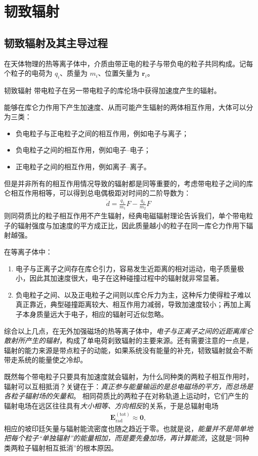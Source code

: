 \section{韧致辐射}
\subsection{韧致辐射及其主导过程}
在天体物理的热等离子体中，介质由带正电的粒子与带负电的粒子共同构成。记每个粒子的电荷为 $q_i$、质量为 $m_i$、位置矢量为 $\boldsymbol r_i$。
\begin{definition}{韧致辐射}
    带电粒子在另一带电粒子的库伦场中获得加速度产生的辐射。
\end{definition}
能够在库仑力作用下产生加速度、从而可能产生辐射的两体相互作用，大体可以分为三类：
\begin{itemize}
  \item 负电粒子与正电粒子之间的相互作用，例如电子与离子；
  \item 负电粒子之间的相互作用，例如电子--电子；
  \item 正电粒子之间的相互作用，例如离子--离子。
\end{itemize}
但是并非所有的相互作用情况导致的辐射都是同等重要的，考虑带电粒子之间的库仑相互作用相等，可以得到总电偶极距对时间的二阶导数为：
\begin{align}
    \ddot{d} = \frac{q_1}{m_1}F - \frac{q_2}{m_2}F
\end{align}
则同荷质比的粒子相互作用不产生辐射，经典电磁辐射理论告诉我们，单个带电粒子的辐射强度与加速度的平方成正比，因此质量越小的粒子在同一库仑力作用下辐射越强。

在等离子体中：
\begin{enumerate}
  \item 电子与正离子之间存在库仑引力，容易发生近距离的相对运动，电子质量极小，因此其加速度很大，电子在这种碰撞过程中的辐射就非常显著。
  \item 负电粒子之间、以及正电粒子之间则以库仑斥力为主，这种斥力使得粒子难以真正靠近，典型碰撞距离较大、相互作用力减弱，导致加速度较小；再加上离子本身质量远大于电子，相应的辐射可近似忽略。
\end{enumerate}

综合以上几点，在无外加强磁场的热等离子体中，\emph{电子与正离子之间的近距离库仑散射所产生的辐射}，构成了单电荷刹致辐射的主要来源。还有需要注意的一点是，辐射的能力来源是带点粒子的动能，如果系统没有能量的补充，韧致辐射就会不断带走系统的能量使之冷却。

\begin{derivationnote}
  既然每个带电粒子只要具有加速度就会辐射，为什么同种类的两粒子相互作用时，辐射可以互相抵消？关键在于：\emph{真正参与能量输运的是总电磁场的平方，而总场是各粒子辐射场的矢量和}。
  相同荷质比的两粒子在对称轨道上运动时，它们产生的辐射电场在远区往往具有\emph{大小相等、方向相反}的关系，于是总辐射电场
  \begin{align}
    \boldsymbol E_{\mathrm{rad}}^{\mathrm{(tot)}} \approx \boldsymbol 0,
  \end{align}
  相应的坡印廷矢量与辐射能流密度也随之趋近于零。也就是说，\emph{能量并不是简单地把每个粒子“单独辐射”的能量相加，而是要先叠加场，再计算能流}，这就是“同种类两粒子辐射相互抵消”的根本原因。
\end{derivationnote}

